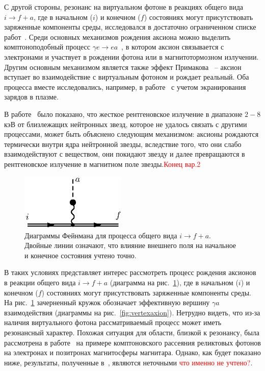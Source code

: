 С другой стороны, резонанс на виртуальном фотоне в реакциях общего вида $i \to f + a$, где в начальном ($i$) и конечном ($f$) состояниях могут присутствовать заряженные компоненты среды, исследовался в достаточно ограниченном списке работ~\cite{Skobelev:2000,Skobelev:2007,MikhRumShk:09}. Среди основных механизмов рождения аксиона можно выделить комптоноподобный процесс $\gamma e \to e a$~\cite{Skobelev:2000}, в котором аксион связывается с электронами и участвует в рождении фотона или в магнитотормозном излучении. Другим основным механизмом является также эффект Примакова~\cite{Primakoff:1951} -- аксион вступает во взаимодействие с виртуальным фотоном и рождает реальный. Оба процесса вместе исследовались, например, в работе~\cite{Raffelt:1996} с учетом экранирования зарядов в плазме.

В работе~\cite{Buschmann:2021} было показано, что жесткое рентгеновское излучение в диапазоне $2-8$ кэВ от близлежащих нейтронных звезд, которое не удалось связать с другими процессами, может быть объяснено следующим механизмом: аксионы рождаются термически внутри ядра нейтронной звезды, вследствие того, что они слабо взаимодействуют с веществом, они покидают звезду и далее превращаются в рентгеновское излучение в магнитном поле звезды.\textcolor{red}{Конец вар.2}

%
\begin{figure}
\centerline{\includegraphics[width=5cm]{fig5_1.eps}}
\caption{Диаграммы Фейнмана для процесса общего вида $i \to 
f+a$. Двойные линии означают, что влияние внешнего поля на начальное и 
конечное состояния учтено точно.}
\label{fig:Diagaxion}
\end{figure}


В таких условиях представляет интерес рассмотреть процесс рождения аксионов   в 
реакции общего вида $i \to f + a$ (диаграмма на рис.~\ref{fig:Diagaxion}), 
где в начальном ($i$) и конечном ($f$) состояниях могут присутствовать 
заряженные компоненты среды. 
На рис.~\ref{fig:Diagaxion} зачерненный
кружок обозначает эффективную вершину $\gamma a$ взаимодействия
(диаграммы на рис.~\ref{fig:vertexaxion}). Нетрудно видеть, что из-за наличия виртуального 
фотона рассматриваемый процесс может иметь резонансный характер. Похожая ситуация
для области, близкой к резонансу, была рассмотрена в работе~\cite{Skobelev:2007} 
на примере
комптоновского рассеяния реликтовых фотонов на электронах и позитронах магнитосферы
магнитара. Однако, как будет показано ниже,  результаты, полученные 
в~\cite{Skobelev:2007}, являются неточными \textcolor{red}{что именно не учтено?}. 

